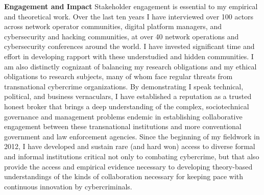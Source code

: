 \documentclass[11pt]{letter}
\begin{document}
\begin{letter}
\textbf{Engagement and Impact} \vspace{0.2 \baselineskip} \newline %
%
Stakeholder engagement is essential to my empirical and theoretical work.
%
Over the last ten years I have interviewed over 100 actors across network
operator communities, digital platform managers, and cybersecurity and hacking communities, at over 40 network operations and cybersecurity conferences around the world.
%
I have invested significant time and effort in developing rapport with these  understudied and hidden communities.
%
I am also distinctly cognizant of balancing my research obligations and my ethical obligations to research subjects, many of whom face regular threats from transnational cybercrime organizations.
%
%
By demonstrating I speak technical, political, and business vernaculars, I have established a reputation as a trusted honest broker that brings a deep understanding of the complex, sociotechnical governance and management problems endemic in establishing collaborative engagement between these transnational institutions and more conventional government and law enforcement agencies.
%
Since the beginning of my fieldwork in 2012, I have developed and sustain rare (and hard won) access to diverse formal and informal institutions critical not only to combating cybercrime, but that also provide the access and empirical evidence necessary to developing theory-based understandings of the kinds of collaboration necessary for keeping pace with continuous innovation by cybercriminals.
%


\end{letter}
\end{document}
